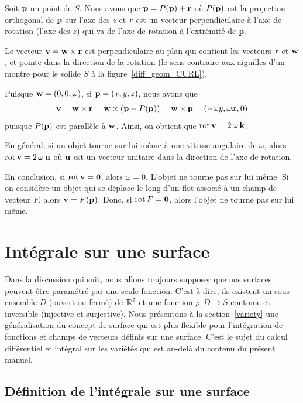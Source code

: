 {Soit $\mathbf{p}$ un point de $S$.
Nous avons que $\mathbf{p} = P(\mathbf{p}) + \mathbf{r}$ où $P(\mathbf{p})$ est la
projection orthogonal de $\mathbf{p}$ sur l'axe des $z$ et $\mathbf{r}$ est
un vecteur perpendiculaire à l'axe de rotation (l'axe des $z$) qui
va de l'axe de rotation à l'extrémité de $\mathbf{p}$.

Le vecteur $\mathbf{v} = \mathbf{w} \times \mathbf{r}$ est perpendiculaire au
plan qui contient les vecteurs $\mathbf{r}$ et $\mathbf{w}$, et pointe dans
la direction de la rotation (le sens contraire aux aiguilles d'un montre
pour le solide $S$ à la figure~\ref{diff_geom_CURL}).

Puisque $\mathbf{w} = (0,0,\omega)$, si $\mathbf{p} = (x,y,z)$, nous avons que
\[
\mathbf{v} = \mathbf{w} \times \mathbf{r} = \mathbf{w} \times (\mathbf{p} - P(\mathbf{p}))
= \mathbf{w} \times \mathbf{p} = (-\omega y, \omega x, 0)
\]
puisque $P(\mathbf{p})$ est parallèle à $\mathbf{w}$.  Ainsi, on obtient que
$\operatorname{rot} \mathbf{v}  = 2\, \omega\, \mathbf{k}$.

En général, si un objet tourne sur lui même à une vitesse angulaire de
$\omega$, alors $\operatorname{rot} \mathbf{v}  = 2\, \omega\, \mathbf{u}$ où
$\mathbf{u}$ est un vecteur unitaire dans la direction de l'axe de
rotation.

En conclusion, si $\operatorname{rot} \mathbf{v} = \mathbf{0}$, alors $\omega =0$.
L'objet ne tourne pas sur lui même.  Si on considère un objet qui se
déplace le long d'un flot associé à un champ de vecteur $F$, alors
$\mathbf{v} = F(\mathbf{p})$.  Donc, si $\operatorname{rot} F = \mathbf{0}$, alors l'objet
ne tourne pas sur lui même.

\section{Intégrale sur une surface}

Dans la discussion qui suit, nous allons toujours supposer que nos surfaces
peuvent être paramétré par une seule fonction.  C'est-à-dire, ils
existent un sous-ensemble $D$ (ouvert ou fermé) de $\mathbb{R}^2$ et une
fonction $\rho:D \to S$ continue et inversible (injective et
surjective).  Nous présentons à la section~\ref{variety} une généralisation
du concept de surface qui est plus flexible pour l'intégration de
fonctions et champs de vecteurs définis sur une surface.  C'est le
sujet du calcul différentiel et intégral sur les variétés qui est
au-delà du contenu du présent manuel.

\subsection{Définition de l'intégrale sur une surface} 

}
